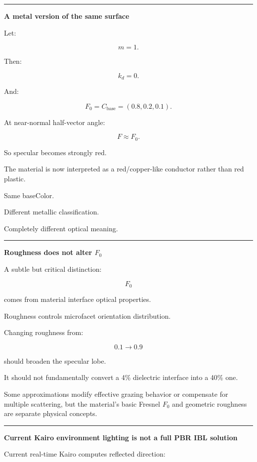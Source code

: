 \begin{center}\rule{0.5\linewidth}{0.5pt}\end{center}

\textbf{A metal version of the same surface}

Let:

\[
m=1.
\]

Then:

\[
k_d=0.
\]

And:

\[
F_0=C_{\text{base}}
=
(0.8,0.2,0.1).
\]

At near-normal half-vector angle:

\[
F\approx F_0.
\]

So specular becomes strongly red.

The material is now interpreted as a red/copper-like conductor rather than red plastic.

Same baseColor.

Different metallic classification.

Completely different optical meaning.

\begin{center}\rule{0.5\linewidth}{0.5pt}\end{center}

\textbf{Roughness does not alter \(F_0\)}

A subtle but critical distinction:

\[
F_0
\]

comes from material interface optical properties.

Roughness controls microfacet orientation distribution.

Changing roughness from:

\[
0.1\rightarrow0.9
\]

should broaden the specular lobe.

It should not fundamentally convert a 4\% dielectric interface into a 40\% one.

Some approximations modify effective grazing behavior or compensate for multiple scattering, but the material's basic Fresnel \(F_0\) and geometric roughness are separate physical concepts.

\begin{center}\rule{0.5\linewidth}{0.5pt}\end{center}

\textbf{Current Kairo environment lighting is not a full PBR IBL solution}

Current real-time Kairo computes reflected direction:

